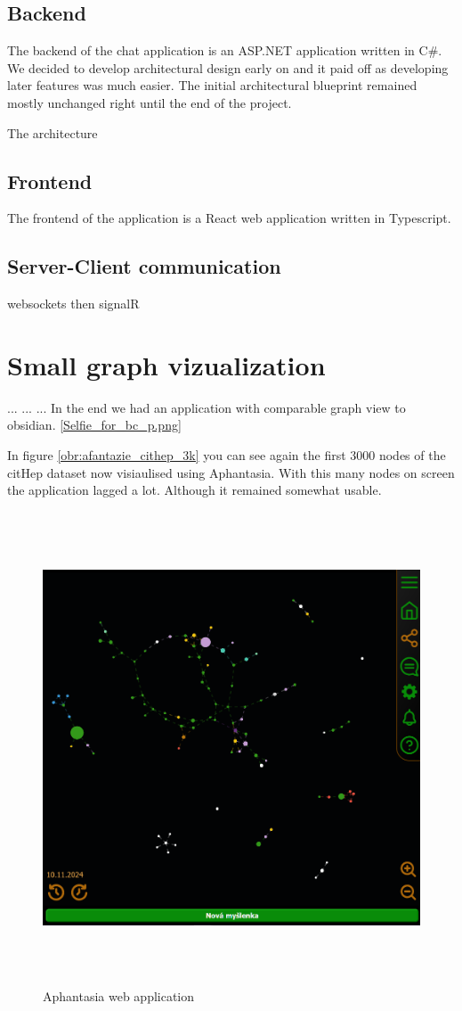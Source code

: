 \subsection{Backend}
The backend of the chat application is an ASP.NET application written in C\#.
We decided to develop architectural design early on and it paid off as developing later features was much easier. 
The initial architectural blueprint remained mostly unchanged right until the end of the project.

The architecture 


\subsection{Frontend}
The frontend of the application is a React web application written in Typescript. 

\subsection{Server-Client communication}
websockets then signalR

\section{Small graph vizualization}
...
...
...
In the end we had an application with comparable graph view to obsidian. \ref{Selfie_for_bc_p.png} 

In figure \ref{obr:afantazie_cithep_3k} you can see again the first 3000 nodes of the citHep dataset now visiaulised using Aphantasia.
With this many nodes on screen the application lagged a lot. Although it remained somewhat usable.

\begin{figure}[p]\centering
    \includegraphics[width=140mm, height=140mm]{img/Selfie_for_bc_p.png}
    \caption{Aphantasia web application}
    \label{obr:afantazie_selfie}
\end{figure}

